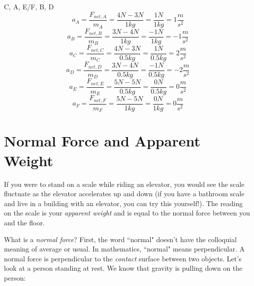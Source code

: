 \begin{Answer}[ref = netF]
C, A, E/F, B, D
$$a_A = \frac{F_{net, A}}{m_A} = \frac{4N - 3N}{1kg} = \frac{1N}{1kg} = 1 
\frac{m}{s^2}$$
$$a_B = \frac{F_{net, B}}{m_B} = \frac{3N - 4N}{1kg} = \frac{-1N}{1kg} = -1 
\frac{m}{s^2}$$
$$a_C = \frac{F_{net, C}}{m_C} = \frac{4N - 3N}{0.5kg} = \frac{1N}{0.5kg} = 2 
\frac{m}{s^2}$$
$$a_D = \frac{F_{net, D}}{m_D} = \frac{3N - 4N}{0.5kg} = \frac{-1N}{0.5kg} = -2 
\frac{m}{s^2}$$
$$a_E = \frac{F_{net, E}}{m_E} = \frac{5N - 5N}{0.5kg} = \frac{0N}{0.5kg} = 0 
\frac{m}{s^2}$$
$$a_F = \frac{F_{net, F}}{m_F} = \frac{5N - 5N}{1kg} = \frac{0N}{1kg} = 0 
\frac{m}{s^2}$$
\end{Answer}

\section{Normal Force and Apparent Weight}
If you were to stand on a scale while riding an elevator, you would see the scale 
fluctuate as the elevator accelerates up and down (if you have a bathroom scale 
and live in a building with an elevator, you can try this yourself!). The reading 
on the scale is your \textit{apparent weight} and is equal to the normal force 
between you and the floor. 

What is a \textit{normal force}? First, the word ``normal" doesn't have the 
colloquial meaning of average or usual. In mathematics, ``normal" means 
perpendicular. A normal force is perpendicular to the \emph{contact} surface between 
two objects. Let's look at a person standing at rest. We know that gravity is 
pulling down on the person:

